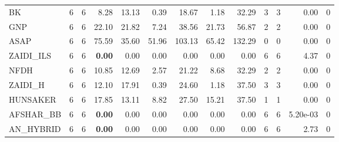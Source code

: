 \begin{table}[htbp]
\begin{tabular}{lrrrrrrrrrrrr}
BK & 6 & 6 & 8.28 & 13.13 & 0.39 & 18.67 & 1.18 & 32.29 & 3 & 3 & 0.00 & 0 \\
GNP & 6 & 6 & 22.10 & 21.82 & 7.24 & 38.56 & 21.73 & 56.87 & 2 & 2 & 0.00 & 0 \\
ASAP & 6 & 6 & 75.59 & 35.60 & 51.96 & 103.13 & 65.42 & 132.29 & 0 & 0 & 0.00 & 0 \\
ZAIDI\_ILS & 6 & 6 & \textbf{0.00} & 0.00 & 0.00 & 0.00 & 0.00 & 0.00 & 6 & 6 & 4.37 & 0 \\
NFDH & 6 & 6 & 10.85 & 12.69 & 2.57 & 21.22 & 8.68 & 32.29 & 2 & 2 & 0.00 & 0 \\
ZAIDI\_H & 6 & 6 & 12.10 & 17.91 & 0.39 & 24.60 & 1.18 & 37.50 & 3 & 3 & 0.00 & 0 \\
HUNSAKER & 6 & 6 & 17.85 & 13.11 & 8.82 & 27.50 & 15.21 & 37.50 & 1 & 1 & 0.00 & 0 \\
AFSHAR\_BB & 6 & 6 & \textbf{0.00} & 0.00 & 0.00 & 0.00 & 0.00 & 0.00 & 6 & 6 & 5.20e-03 & 0 \\
AN\_HYBRID & 6 & 6 & \textbf{0.00} & 0.00 & 0.00 & 0.00 & 0.00 & 0.00 & 6 & 6 & 2.73 & 0 \\
\bottomrule
\end{tabular}
\end{table}

